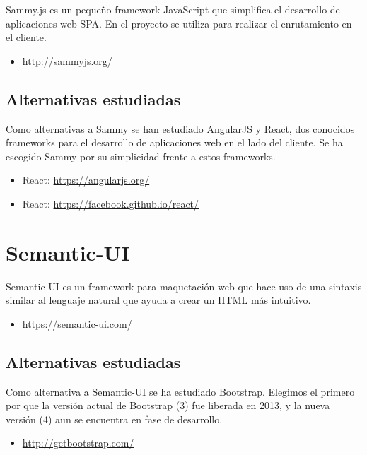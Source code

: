 Sammy.js es un pequeño framework JavaScript que simplifica el desarrollo de aplicaciones web SPA.
En el proyecto se utiliza para realizar el enrutamiento en el cliente.

\begin{itemize}
	\item \url{http://sammyjs.org/}
\end{itemize}

\subsection{Alternativas estudiadas}

Como alternativas a Sammy se han estudiado AngularJS y React, dos conocidos frameworks para el desarrollo de aplicaciones web en el lado del cliente. Se ha escogido Sammy por su simplicidad frente a estos frameworks.

\begin{itemize}
	\item React: \url{https://angularjs.org/}
	\item React: \url{https://facebook.github.io/react/}
\end{itemize}

\section{Semantic-UI}

Semantic-UI es un framework para maquetación web que hace uso de una sintaxis similar al lenguaje natural que ayuda a crear un HTML más intuitivo.

\begin{itemize}
	\item \url{https://semantic-ui.com/}
\end{itemize}

\subsection{Alternativas estudiadas}

Como alternativa a Semantic-UI se ha estudiado Bootstrap. Elegimos el primero por que la versión actual de Bootstrap (3) fue liberada en 2013, y la nueva versión (4) aun se encuentra en fase de desarrollo.

\begin{itemize}
	\item \url{http://getbootstrap.com/}
\end{itemize}

